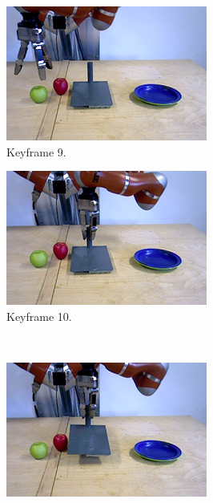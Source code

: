 \begin{figure}
\begin{subfigure}[t]{0.475\textwidth}
    \includegraphics[width=\textwidth]{./figures/sec/planning/exec2/frame2493.jpg}
    \caption{Keyframe 9.}
    \label{fig:sec_usingaffordanceforplanning_results_scenario2_9}
  \end{subfigure}
  \hfill
  \begin{subfigure}[t]{0.475\textwidth}
    \includegraphics[width=\textwidth]{./figures/sec/planning/exec2/frame3592.jpg}
    \caption{Keyframe 10.}
    \label{fig:sec_usingaffordanceforplanning_results_scenario2_10}
  \end{subfigure}\\%
  \begin{subfigure}[t]{0.475\textwidth}
    \includegraphics[width=\textwidth]{./figures/sec/planning/exec2/frame3663.jpg}

\end{subfigure}
\end{figure}

